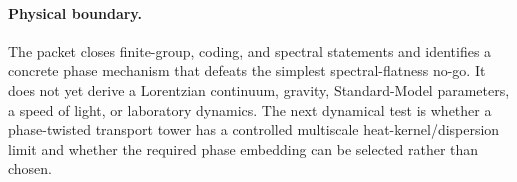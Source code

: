 \paragraph{Physical boundary.}
The packet closes finite-group, coding, and spectral statements and identifies
a concrete phase mechanism that defeats the simplest spectral-flatness no-go.
It does not yet derive a Lorentzian continuum, gravity, Standard-Model
parameters, a speed of light, or laboratory dynamics.  The next dynamical test
is whether a phase-twisted transport tower has a controlled multiscale
heat-kernel/dispersion limit and whether the required phase embedding can be
selected rather than chosen.
